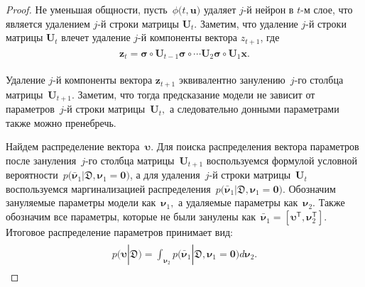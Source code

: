 \documentclass[12pt]{a&t}
\begin{document}
\begin{proof}
Не уменьшая общности, пусть~$\phi\bigr(t, \mathbf{u}\bigr)$ удаляет $j$-й нейрон в $t$-м слое, что является удалением $j$-й строки матрицы $\mathbf{U}_t$. Заметим, что удаление $j$-й строки матрицы $\mathbf{U}_t$ влечет удаление $j$-й компоненты вектора $z_{t+1}$, где
\begin{gather}
\label{eq:ap:tr:neural:1}
\begin{aligned}
\mathbf{z}_{t} = \bm{\sigma} \circ \mathbf{U}_{t-1} \bm{\sigma} \circ \cdots  \mathbf{U}_2\bm{\sigma} \circ \mathbf{U}_1\mathbf{x}.
\end{aligned}
\end{gather}

Удаление $j$-й компоненты вектора $\mathbf{z}_{t+1}$ эквивалентно занулению~$j$-го столбца матрицы~$\mathbf{U}_{t+1}.$ Заметим, что тогда предсказание модели не зависит от параметров~$j$-й строки матрицы~$\mathbf{U}_t,$ а следовательно донными параметрами также можно пренебречь.

Найдем распределение вектора~$\bm{\upsilon}.$ Для поиска распределения вектора параметров после зануления~$j$-го столбца матрицы~$\mathbf{U}_{t+1}$ воспользуемся формулой условной вероятности~$p\bigr(\bar{\bm{\nu}}_1|\mathfrak{D}, \bm{\nu}_1=\mathbf{0}\bigr)$, а для удаления~$j$-й строки матрицы~$\mathbf{U}_{t}$ воспользуемся маргинализацией распределения~$p\bigr(\bar{\bm{\nu}}_1|\mathfrak{D}, \bm{\nu}_1=\mathbf{0}\bigr)$. Обозначим зануляемые параметры модели как~$\bm{\nu}_1,$ а удаляемые параметры как~$\bm{\nu}_2.$ Также обозначим все параметры, которые не были занулены как~$\bar{\bm{\nu}}_1 = [\bm{\upsilon}^{\mathsf{T}}, \bm{\nu}_2^{\mathsf{T}}].$ Итоговое распределение параметров принимает  вид:
\begin{gather}
\label{eq:ap:tr:1:1}
\begin{aligned}
p\bigr(\bm{\upsilon}|\mathfrak{D}\bigr)  = \int_{\bm{\nu}_2}p\bigr(\bar{\bm{\nu}}_1|\mathfrak{D}, \bm{\nu}_1=\mathbf{0}\bigr) d\bm{\nu}_2.
\end{aligned}
\end{gather}


\end{proof}
\end{document}
